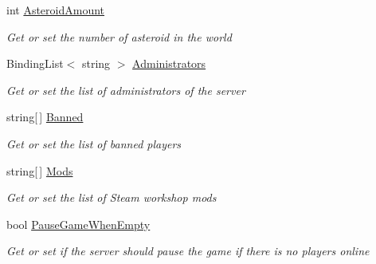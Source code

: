 \begin{DoxyCompactItemize}
int \hyperlink{class_s_e_mod_a_p_i_1_1_a_p_i_1_1_definitions_1_1_dedicated_config_definition_a435301f8c4bb00cd091f684943c89752}{Asteroid\+Amount}
\begin{DoxyCompactList}\small\item\em Get or set the number of asteroid in the world \end{DoxyCompactList}\item 
Binding\+List$<$ string $>$ \hyperlink{class_s_e_mod_a_p_i_1_1_a_p_i_1_1_definitions_1_1_dedicated_config_definition_a817adae3e7136d5917dac5ac2f8d7db7}{Administrators}
\begin{DoxyCompactList}\small\item\em Get or set the list of administrators of the server \end{DoxyCompactList}\item 
string\mbox{[}$\,$\mbox{]} \hyperlink{class_s_e_mod_a_p_i_1_1_a_p_i_1_1_definitions_1_1_dedicated_config_definition_a714a0afcb6eb7860429373ae700fb5e6}{Banned}
\begin{DoxyCompactList}\small\item\em Get or set the list of banned players \end{DoxyCompactList}\item 
string\mbox{[}$\,$\mbox{]} \hyperlink{class_s_e_mod_a_p_i_1_1_a_p_i_1_1_definitions_1_1_dedicated_config_definition_a227e7b6668d1e6d8d97f5c59c9535c39}{Mods}
\begin{DoxyCompactList}\small\item\em Get or set the list of Steam workshop mods \end{DoxyCompactList}\item 
bool \hyperlink{class_s_e_mod_a_p_i_1_1_a_p_i_1_1_definitions_1_1_dedicated_config_definition_a29647ac9db4e97a89e8ae4030e2980cd}{Pause\+Game\+When\+Empty}
\begin{DoxyCompactList}\small\item\em Get or set if the server should pause the game if there is no players online \end{DoxyCompactList}\item 

\end{DoxyCompactItemize}
